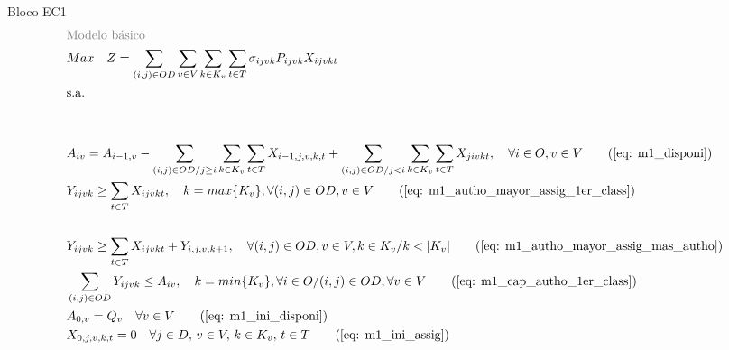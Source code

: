 \begin{bloque1}{Bloco \hypertarget{frase:EC1}{EC1} }
\allowdisplaybreaks
\begin{align}
	 & \textcolor{gray}{\text{Modelo básico}} \notag   \\
	 & Max \quad Z = \sum_{(i,j)\in OD} \sum_{v\in V} \sum_{k\in K_v} \sum_{t\in T} \sigma_{ijvk}  P_{ijvk} X_{ijvkt}     \label{eq: fo_beha}                                                                                \\
	 & \text{s.a.}  \notag                                                                                                                                                                                                    \\
	 & \text{}  \notag \\ \notag \\
	 & A_{iv} = A_{i-1,v} - \sum_{(i,j) \in OD/j \geq i} \sum_{k\in K_v}\sum_{t\in T}X_{i-1,j,v,k,t} + \sum_{(i,j) \in OD/j<i} \sum_{k\in K_v}\sum_{t\in T}X_{jivkt}, \quad \forall i \in O, v \in V   \tag{\ref{eq: m1_disponi}} \\
	 & Y_{ijvk} \geq  \sum_{t \in T} X_{ijvkt},  \quad k = max\{K_v\}, \forall(i,j) \in OD ,v \in V     \tag{\ref{eq: m1_autho_mayor_assig_1er_class}}                                                                            \\
	 & \notag \\
	 & Y_{ijvk} \geq  \sum_{t \in T} X_{ijvkt} + Y_{i,j,v,k + 1} , \quad \forall(i,j) \in OD, v \in V, k \in K_v / k < |K_v|  \tag{\ref{eq: m1_autho_mayor_assig_mas_autho}}                                         \\
	 & \sum_{(i,j) \in OD} Y_{ijvk} \leq A_{iv}, \quad  k = min\{K_v\}, \forall i \in O / (i,j) \in OD,   \forall v \in V       \tag{\ref{eq: m1_cap_autho_1er_class}}                                                            \\
	 & A_{0,v} = Q_v \quad \forall v \in V  \tag{\ref{eq: m1_ini_disponi}}                                                                                                                                                        \\
	 & X_{0,j,v,k,t} = 0 \quad \forall j \in D,\, v \in V,\, k \in K_v,\, t \in T  \tag{\ref{eq: m1_ini_assig}}                                                                                                                   \\

\end{align}
\end{bloque1}
